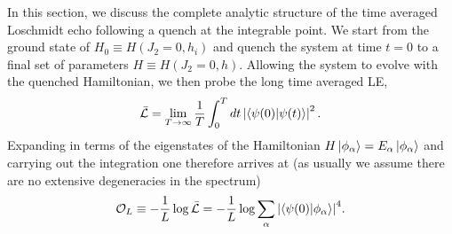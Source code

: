 \documentclass[aps,prx,twocolumn]{revtex4-2}
\begin{document}
In this section, we discuss the complete analytic structure of the time averaged Loschmidt echo following a quench at the integrable point. We start from the ground state of  {$H_0\equiv H(J_2=0, h_i)$} and quench the system at time $t=0$ to a final set of parameters  {$H\equiv H(J_2=0, h)$}. Allowing the system to evolve with the quenched Hamiltonian, we then probe the long time averaged LE,
\begin{equation}
	\bar{\mathcal{L}}=\lim\limits_{T\rightarrow\infty}\frac{1}{T}\int_{0}^{T}dt\left|\braket{\psi(0)|\psi(t)}\right|^2.
\end{equation} 
Expanding in terms of the eigenstates of the Hamiltonian $H\ket{\phi_{\alpha}}=E_{\alpha}\ket{\phi_{\alpha}}$ and carrying out the integration one therefore arrives at  {(as usually we assume there are no extensive degeneracies in the spectrum)}
\begin{equation}\label{eq:ol}
	\mathcal{O}_L\equiv-\frac{1}{L}\log{\bar{\mathcal{L}}}=-\frac{1}{L}\log{\sum\limits_{\alpha}\left|\braket{\psi(0)|\phi_{\alpha}}\right|^4}.
\end{equation}
\end{document}
